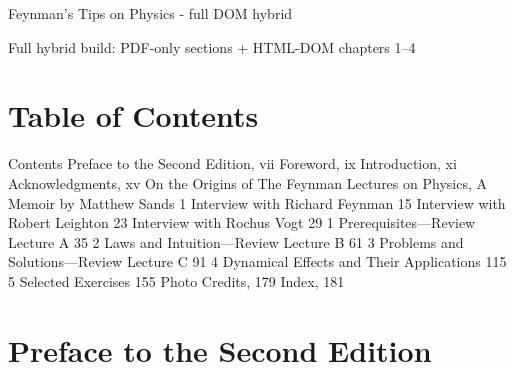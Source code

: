 \documentclass[11pt,oneside]{article}
\begin{document}
\tableofcontents


\begin{center}

{\Large Feynman's Tips on Physics - full DOM hybrid\par}

\vspace{4mm}

{\small Full hybrid build: PDF-only sections + HTML-DOM chapters 1--4\par}

\end{center}

\bigskip

\clearpage


\section*{Table of Contents}



\label{tips-sec-0-table-of-contents}


Contents Preface to the Second Edition, vii Foreword, ix Introduction, xi Acknowledgments, xv On the Origins of The Feynman Lectures on Physics, A Memoir by Matthew Sands 1 Interview with Richard Feynman 15 Interview with Robert Leighton 23 Interview with Rochus Vogt 29 1 Prerequisites---Review Lecture A 35 2 Laws and Intuition---Review Lecture B 61 3 Problems and Solutions---Review Lecture C 91 4 Dynamical Effects and Their Applications 115 5 Selected Exercises 155 Photo Credits, 179 Index, 181\par



\clearpage


\section*{Preface to the Second Edition}


\end{document}
